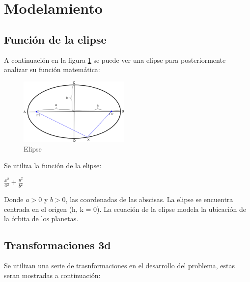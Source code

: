 \documentclass[12pt,journal,compsoc]{IEEEtran}
\begin{document}
\section{Modelamiento}
\subsection{Función de la elipse}
A continuación en la figura \ref{Elipse} se puede ver una elipse para posteriormente analizar su función matemática:
\begin{figure}[h!]
  \includegraphics[width=0.48\textwidth]{Elipse.png}
  \caption{Elipse}
  \captionsetup{justification=centering}
  \label{Elipse}
\end{figure}

Se utiliza la función de la elipse:
\begin{huge}
\begin{center}
$\frac{x^{2}}{a^{2}} + \frac{y^{2}}{b^{2}}$
\end{center}
\end{huge}
Donde $a>0$ y $b>0$, las coordenadas de las abscisas. La elipse se encuentra centrada en el origen (h, k = 0). La ecuación de la elipse modela la ubicación de la órbita de los planetas.
\subsection{Transformaciones 3d}
Se utilizan una serie de trasnformaciones en el desarrollo del problema, estas seran mostradas a continuación:
\end{document}
